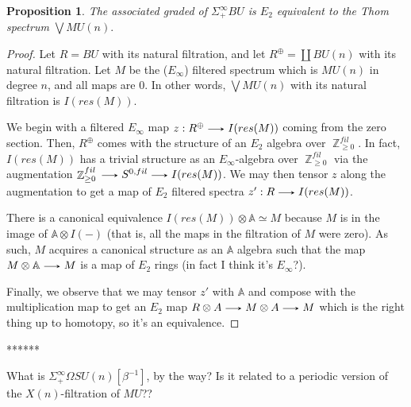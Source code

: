 \documentclass[11pt]{article}
\theoremstyle{definition}
\theoremstyle{plain}
\newtheorem{prop}[nul]{Proposition}
\numberwithin{equation}{nul}
\theoremstyle{TheoremNum}
\DeclareMathOperator{\Z}{\mathbb{Z}}
\renewcommand{\to}{\ \tikz[baseline]\draw[>=stealth,->](0,0.5ex)--(0.5,0.5ex);\ }
\begin{document}
\begin{prop}The associated graded of $\Sigma^{\infty}_+BU$ is $E_2$ equivalent to the Thom spectrum $\bigvee MU(n).$
\end{prop}
\begin{proof}
Let $R = BU$ with its natural filtration, and let $R^{\oplus} = \coprod BU(n)$ with its natural filtration.  Let $M$ be the ($E_\infty$) filtered spectrum which is $MU(n)$ in degree $n$, and all maps are $0$.  In other words, $\bigvee MU(n)$ with its natural filtration is $I(res(M))$.  

We begin with a filtered $E_\infty$ map $z:R^\oplus \to I(res(M))$ coming from the zero section.  Then, $R^\oplus$ comes with the structure of an $E_2$ algebra over $\Z_{\geq 0}^{fil}$.  In fact, $I(res(M))$  has a trivial structure as an $E_\infty$-algebra over $\Z_{\geq 0}^{fil}$ via the augmentation $\Z_{\geq 0}^{fil}\to S^{0,fil} \to I(res(M))$.  We may then tensor $z$ along the augmentation to get a map of $E_2$ filtered spectra $z':R \to I(res(M))$.  

There is a canonical equivalence $I(res(M)) \otimes \mathbb{A} \simeq M$ because $M$ is in the image of $\mathbb{A} \otimes I(-)$ (that is, all the maps in the filtration of $M$ were zero).  As such, $M$ acquires a canonical structure as an $\mathbb{A}$ algebra such that the map $M \otimes \mathbb{A} \to M$ is a map of $E_2$ rings (in fact I think it's $E_\infty$?).  

Finally, we observe that we may tensor $z'$ with $\mathbb{A}$ and compose with the multiplication map to get an $E_2$ map $R\otimes A \to M \otimes A \to M$ which is the right thing up to homotopy, so it's an equivalence.  
\end{proof}

******  

What is $\Sigma^{\infty}_+ \Omega SU(n)[\beta^{-1}]$, by the way?  Is it related to a periodic version of the $X(n)$-filtration of $MU$??


\end{document}
